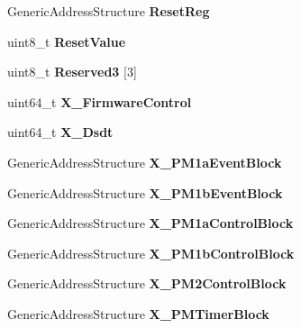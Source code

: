 \begin{DoxyCompactItemize}
\item 
Generic\+Address\+Structure {\bfseries Reset\+Reg}\hypertarget{structFADT_a29a833d54694ac4048b4e0c83876435b}{}\label{structFADT_a29a833d54694ac4048b4e0c83876435b}

\item 
uint8\+\_\+t {\bfseries Reset\+Value}\hypertarget{structFADT_af9ca02451305ba79460fc7ae589eb4cc}{}\label{structFADT_af9ca02451305ba79460fc7ae589eb4cc}

\item 
uint8\+\_\+t {\bfseries Reserved3} \mbox{[}3\mbox{]}\hypertarget{structFADT_a4a94201bd36b78e29b2a2952a85181e5}{}\label{structFADT_a4a94201bd36b78e29b2a2952a85181e5}

\item 
uint64\+\_\+t {\bfseries X\+\_\+\+Firmware\+Control}\hypertarget{structFADT_a7629db5fdd1fb5c6e75e03c08b0d0e3e}{}\label{structFADT_a7629db5fdd1fb5c6e75e03c08b0d0e3e}

\item 
uint64\+\_\+t {\bfseries X\+\_\+\+Dsdt}\hypertarget{structFADT_a3608848cacb815c38319008443251c96}{}\label{structFADT_a3608848cacb815c38319008443251c96}

\item 
Generic\+Address\+Structure {\bfseries X\+\_\+\+P\+M1a\+Event\+Block}\hypertarget{structFADT_a224ee3fd2091b2cb4d5288966efc1e57}{}\label{structFADT_a224ee3fd2091b2cb4d5288966efc1e57}

\item 
Generic\+Address\+Structure {\bfseries X\+\_\+\+P\+M1b\+Event\+Block}\hypertarget{structFADT_af6521309129b600e5db56c01db88487b}{}\label{structFADT_af6521309129b600e5db56c01db88487b}

\item 
Generic\+Address\+Structure {\bfseries X\+\_\+\+P\+M1a\+Control\+Block}\hypertarget{structFADT_aeca2645990ba063217ca2ba792cc041a}{}\label{structFADT_aeca2645990ba063217ca2ba792cc041a}

\item 
Generic\+Address\+Structure {\bfseries X\+\_\+\+P\+M1b\+Control\+Block}\hypertarget{structFADT_ada3bdddfc443eba578284aa68dcec347}{}\label{structFADT_ada3bdddfc443eba578284aa68dcec347}

\item 
Generic\+Address\+Structure {\bfseries X\+\_\+\+P\+M2\+Control\+Block}\hypertarget{structFADT_a34f565c9efecdc431648c7d080e6e33d}{}\label{structFADT_a34f565c9efecdc431648c7d080e6e33d}

\item 
Generic\+Address\+Structure {\bfseries X\+\_\+\+P\+M\+Timer\+Block}\hypertarget{structFADT_aecd4a023f2e6a5538d02b9de8934418a}{}\label{structFADT_aecd4a023f2e6a5538d02b9de8934418a}


\end{DoxyCompactItemize}

